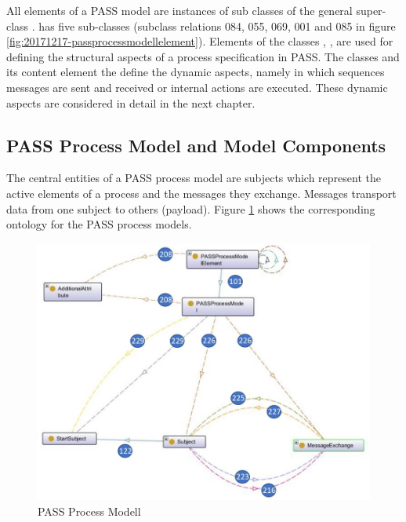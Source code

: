 All elements of a PASS model are instances of sub classes of the general super-class .
 has five sub-classes (subclass relations 084, 055, 069, 001 and 085 in figure \ref{fig:20171217-passprocessmodellelement}). Elements of the classes , ,  are used for defining the structural aspects of a process specification in PASS. The classes  and its content element the   define the dynamic aspects, namely in which sequences messages are sent and received or internal actions are executed. These dynamic aspects are considered in detail in the next chapter. 

\subsection{PASS Process Model and Model Components}

The central entities of a PASS process model are subjects which represent the active elements of a process and the messages they exchange. Messages transport data from one subject to others (payload). Figure \ref{fig:20181217-passprocessmodel} shows the corresponding ontology for the PASS process models.

\begin{figure}[htbp]
	\centering
	\includegraphics[width=1.0\linewidth]{Figures/Ontology/SubjectInteraction/20181217-PASSProcessModel}
	\caption[PASS Process Modell]{PASS Process Modell}
	\label{fig:20181217-passprocessmodel}
\end{figure}

